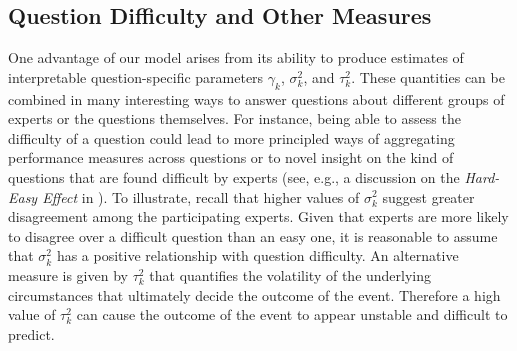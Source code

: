 \documentclass[aoas, preprint]{imsart}
\numberwithin{equation}{section}
\theoremstyle{plain}
\begin{document}








\subsection{Question Difficulty and Other Measures}
\label{QuestionDifficulty}
One advantage of our model arises from its ability to produce estimates of interpretable question-specific parameters $\gamma_k$, $\sigma^2_k$, and $\tau^2_k$. These quantities can be combined in many interesting ways to answer questions about different groups of experts or the questions themselves. For instance, being able to assess the difficulty of a question could lead to more principled ways of aggregating performance measures across questions or to novel insight on the kind of questions that are found difficult by experts (see, e.g., a discussion on the \textit{Hard-Easy Effect} in \cite{Wilson94cognitivefactors}). To illustrate, recall that higher values of $\sigma^2_k$ suggest greater disagreement among the participating experts. Given that experts are more likely to disagree over a difficult question than an easy one, it is reasonable to assume that $\sigma^2_k$ has a positive relationship with question difficulty. An alternative measure is given by $\tau_k^2$ that quantifies the volatility of the underlying circumstances that ultimately decide the outcome of the event. Therefore a high value of $\tau_k^2$ can cause the outcome of the event to appear unstable and difficult to predict. 
\end{document}

